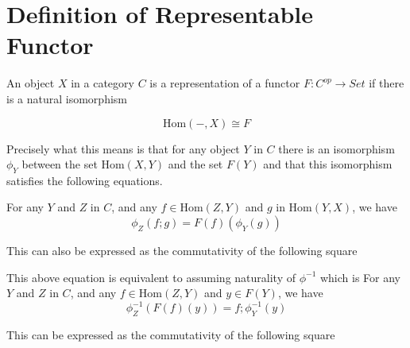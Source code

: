\documentclass[12pt]{article} %
\theoremstyle{definition}
\theoremstyle{definition}
\theoremstyle{definition}
\theoremstyle{definition}
\begin{document}
\section{Definition of Representable Functor}

An object $X$ in a category $C$ is a representation of a functor $F : C^{op} \rightarrow Set$ if there is a natural isomorphism

\begin{equation}
  \text{Hom}(-, X) \cong F
\end{equation}

Precisely what this means is that for any object $Y$ in $C$ there is an isomorphism $\phi_Y$ between the set $\text{Hom}(X, Y)$ and the set $F(Y)$ and
that this isomorphism satisfies the following equations.

For any $Y$ and $Z$ in $C$, and any $f \in \text{Hom}(Z, Y)$ and $g$ in $\text{Hom}(Y, X)$, we have
\begin{equation}
  \phi_Z(f ; g) = F(f)(\phi_Y(g))
\end{equation}

This can also be expressed as the commutativity of the following square



This above equation is equivalent to assuming naturality of $\phi^{-1}$ which is
For any $Y$ and $Z$ in $C$, and any $f \in \text{Hom}(Z, Y)$ and $y \in F(Y)$, we have
\begin{equation}
  \phi_Z^{-1}(F(f)(y)) = f ; \phi_Y^{-1}(y)
\end{equation}

This can be expressed as the commutativity of the following square

\end{document}
